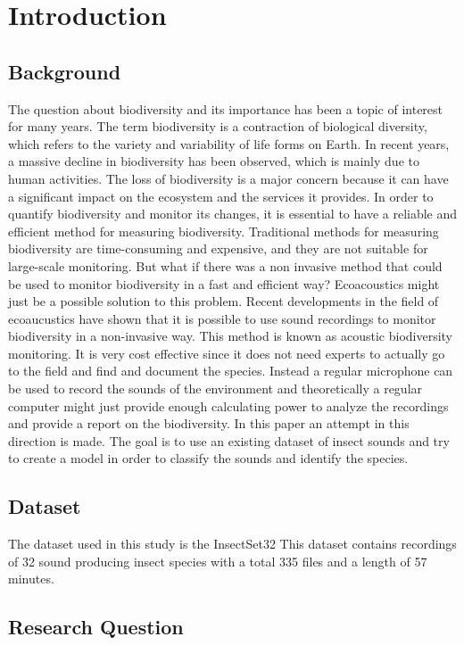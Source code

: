 

\section{Introduction}
\label{section1}

\subsection{Background}

The question about biodiversity and its importance has been a topic of interest for many years. 
The term biodiversity is a contraction of biological diversity, which refers to the variety and variability of life forms on Earth.
In recent years, a massive decline in biodiversity has been observed, which is mainly due to human activities.
The loss of biodiversity is a major concern because it can have a significant impact on the ecosystem and the services it provides.
In order to quantify biodiversity and monitor its changes, it is essential to have a reliable and efficient method for measuring biodiversity.
Traditional methods for measuring biodiversity are time-consuming and expensive, and they are not suitable for large-scale monitoring.
But what if there was a non invasive method that could be used to monitor biodiversity in a fast and efficient way?
Ecoacoustics might just be a possible solution to this problem. Recent developments in the field of ecoaucustics have
shown that it is possible to use sound recordings to monitor biodiversity in a non-invasive way. This method is known as 
acoustic biodiversity monitoring. It is very cost effective since it does not need experts to actually go to the field and
find and document the species. Instead a regular microphone can be used to record the sounds of the environment and theoretically
a regular computer might just provide enough calculating power to analyze the recordings and provide a report on the biodiversity.
In this paper an attempt in this direction is made. The goal is to use an existing dataset of insect sounds and try to create a model
in order to classify the sounds and identify the species.

\subsection{Dataset}

The dataset used in this study is the InsectSet32 \autocite{faissInsectSet32DatasetAutomatic2022} 
This dataset contains recordings of 32 sound producing insect species with a total 335 files and a length of 57 minutes.


\subsection{Research Question}



